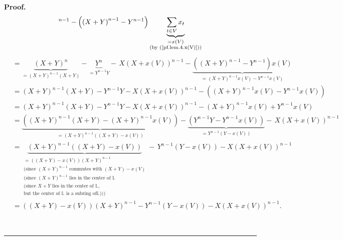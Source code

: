\documentclass[numbers=enddot,12pt,final,onecolumn,notitlepage]{scrartcl}%
\theoremstyle{definition}
\newenvironment{proof}[1][Proof]{\noindent\textbf{#1.} }{\ \rule{0.5em}{0.5em}}
\let\sumnonlimits\sum
\renewcommand{\sum}{\sumnonlimits\limits}
\newenvironment{verlong}{}{}
\begin{document}
\begin{verlong}
\begin{proof}
\begin{align*}
^{n-1}-\left(  \left(  X+Y\right)  ^{n-1}-Y^{n-1}\right)  \underbrace{\sum
_{t\in V}x_{t}}_{\substack{=x\left(  V\right)  \\\text{(by
(\ref{pf.lem.4.x(V)}))}}}
\end{align*}%
\begin{align*}
&  =\underbrace{\left(  X+Y\right)  ^{n}}_{=\left(  X+Y\right)  ^{n-1}\left(
X+Y\right)  }-\underbrace{Y^{n}}_{=Y^{n-1}Y}-\,X\left(  X+x\left(  V\right)
\right)  ^{n-1}-\underbrace{\left(  \left(  X+Y\right)  ^{n-1}-Y^{n-1}\right)
x\left(  V\right)  }_{=\left(  X+Y\right)  ^{n-1}x\left(  V\right)
-Y^{n-1}x\left(  V\right)  }\\
&  =\left(  X+Y\right)  ^{n-1}\left(  X+Y\right)  -Y^{n-1}Y-X\left(
X+x\left(  V\right)  \right)  ^{n-1}-\left(  \left(  X+Y\right)
^{n-1}x\left(  V\right)  -Y^{n-1}x\left(  V\right)  \right) \\
&  =\left(  X+Y\right)  ^{n-1}\left(  X+Y\right)  -Y^{n-1}Y-X\left(
X+x\left(  V\right)  \right)  ^{n-1}-\left(  X+Y\right)  ^{n-1}x\left(
V\right)  +Y^{n-1}x\left(  V\right) \\
&  =\underbrace{\left(  \left(  X+Y\right)  ^{n-1}\left(  X+Y\right)  -\left(
X+Y\right)  ^{n-1}x\left(  V\right)  \right)  }_{=\left(  X+Y\right)
^{n-1}\left(  \left(  X+Y\right)  -x\left(  V\right)  \right)  }%
-\underbrace{\left(  Y^{n-1}Y-Y^{n-1}x\left(  V\right)  \right)  }%
_{=Y^{n-1}\left(  Y-x\left(  V\right)  \right)  }-\,X\left(  X+x\left(
V\right)  \right)  ^{n-1}\\
&  =\underbrace{\left(  X+Y\right)  ^{n-1}\left(  \left(  X+Y\right)
-x\left(  V\right)  \right)  }_{\substack{=\left(  \left(  X+Y\right)
-x\left(  V\right)  \right)  \left(  X+Y\right)  ^{n-1}\\\text{(since }\left(
X+Y\right)  ^{n-1}\text{ commutes with }\left(  X+Y\right)  -x\left(
V\right)  \\\text{(since }\left(  X+Y\right)  ^{n-1}\text{ lies in the center
of }\mathbb{L}\\\text{(since }X+Y\text{ lies in the center of }\mathbb{L}%
\text{,}\\\text{but the center of }\mathbb{L}\text{ is a subring of
}\mathbb{L}\text{)))}}}-\,Y^{n-1}\left(  Y-x\left(  V\right)  \right)
-X\left(  X+x\left(  V\right)  \right)  ^{n-1}\\
&  =\left(  \left(  X+Y\right)  -x\left(  V\right)  \right)  \left(
X+Y\right)  ^{n-1}-Y^{n-1}\left(  Y-x\left(  V\right)  \right)  -X\left(
X+x\left(  V\right)  \right)  ^{n-1}.
\end{align*}

\end{proof}
\end{verlong}
\end{document}
